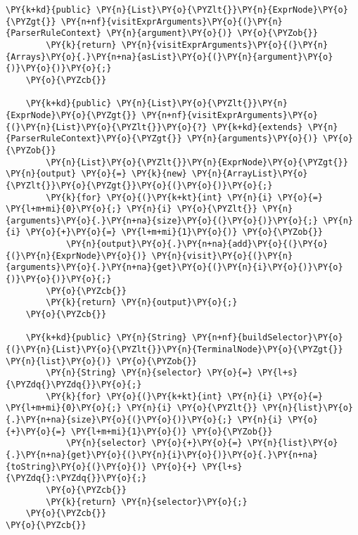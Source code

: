 \begin{Verbatim}[commandchars=\\\{\}]
    \PY{k+kd}{public} \PY{n}{List}\PY{o}{\PYZlt{}}\PY{n}{ExprNode}\PY{o}{\PYZgt{}} \PY{n+nf}{visitExprArguments}\PY{o}{(}\PY{n}{ParserRuleContext} \PY{n}{argument}\PY{o}{)} \PY{o}{\PYZob{}}
        \PY{k}{return} \PY{n}{visitExprArguments}\PY{o}{(}\PY{n}{Arrays}\PY{o}{.}\PY{n+na}{asList}\PY{o}{(}\PY{n}{argument}\PY{o}{)}\PY{o}{)}\PY{o}{;}
    \PY{o}{\PYZcb{}}

    \PY{k+kd}{public} \PY{n}{List}\PY{o}{\PYZlt{}}\PY{n}{ExprNode}\PY{o}{\PYZgt{}} \PY{n+nf}{visitExprArguments}\PY{o}{(}\PY{n}{List}\PY{o}{\PYZlt{}}\PY{o}{?} \PY{k+kd}{extends} \PY{n}{ParserRuleContext}\PY{o}{\PYZgt{}} \PY{n}{arguments}\PY{o}{)} \PY{o}{\PYZob{}}
        \PY{n}{List}\PY{o}{\PYZlt{}}\PY{n}{ExprNode}\PY{o}{\PYZgt{}} \PY{n}{output} \PY{o}{=} \PY{k}{new} \PY{n}{ArrayList}\PY{o}{\PYZlt{}}\PY{o}{\PYZgt{}}\PY{o}{(}\PY{o}{)}\PY{o}{;}
        \PY{k}{for} \PY{o}{(}\PY{k+kt}{int} \PY{n}{i} \PY{o}{=} \PY{l+m+mi}{0}\PY{o}{;} \PY{n}{i} \PY{o}{\PYZlt{}} \PY{n}{arguments}\PY{o}{.}\PY{n+na}{size}\PY{o}{(}\PY{o}{)}\PY{o}{;} \PY{n}{i} \PY{o}{+}\PY{o}{=} \PY{l+m+mi}{1}\PY{o}{)} \PY{o}{\PYZob{}}
            \PY{n}{output}\PY{o}{.}\PY{n+na}{add}\PY{o}{(}\PY{o}{(}\PY{n}{ExprNode}\PY{o}{)} \PY{n}{visit}\PY{o}{(}\PY{n}{arguments}\PY{o}{.}\PY{n+na}{get}\PY{o}{(}\PY{n}{i}\PY{o}{)}\PY{o}{)}\PY{o}{)}\PY{o}{;}
        \PY{o}{\PYZcb{}}
        \PY{k}{return} \PY{n}{output}\PY{o}{;}
    \PY{o}{\PYZcb{}}
    
    \PY{k+kd}{public} \PY{n}{String} \PY{n+nf}{buildSelector}\PY{o}{(}\PY{n}{List}\PY{o}{\PYZlt{}}\PY{n}{TerminalNode}\PY{o}{\PYZgt{}} \PY{n}{list}\PY{o}{)} \PY{o}{\PYZob{}}
        \PY{n}{String} \PY{n}{selector} \PY{o}{=} \PY{l+s}{\PYZdq{}\PYZdq{}}\PY{o}{;}
        \PY{k}{for} \PY{o}{(}\PY{k+kt}{int} \PY{n}{i} \PY{o}{=} \PY{l+m+mi}{0}\PY{o}{;} \PY{n}{i} \PY{o}{\PYZlt{}} \PY{n}{list}\PY{o}{.}\PY{n+na}{size}\PY{o}{(}\PY{o}{)}\PY{o}{;} \PY{n}{i} \PY{o}{+}\PY{o}{=} \PY{l+m+mi}{1}\PY{o}{)} \PY{o}{\PYZob{}}
            \PY{n}{selector} \PY{o}{+}\PY{o}{=} \PY{n}{list}\PY{o}{.}\PY{n+na}{get}\PY{o}{(}\PY{n}{i}\PY{o}{)}\PY{o}{.}\PY{n+na}{toString}\PY{o}{(}\PY{o}{)} \PY{o}{+} \PY{l+s}{\PYZdq{}:\PYZdq{}}\PY{o}{;}
        \PY{o}{\PYZcb{}}
        \PY{k}{return} \PY{n}{selector}\PY{o}{;}
    \PY{o}{\PYZcb{}}
\PY{o}{\PYZcb{}}
\end{Verbatim}
